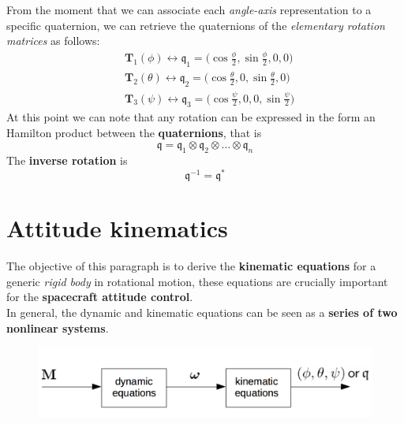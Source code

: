 \noindent
From the moment that we can associate each \textit{angle-axis} representation to a specific quaternion, we can retrieve the quaternions of the \textit{elementary rotation matrices} as follows:
{\Large{
    \begin{align*}
        &\mathbf{T}_1(\phi) \longleftrightarrow
        \mathfrak{q}_1 = \bigg(\cos \frac{\phi}{2}, \sin \frac{\phi}{2}, 0, 0 \bigg)\\
        &\mathbf{T}_2(\theta) \longleftrightarrow 
        \mathfrak{q}_2=\bigg(\cos \frac{\theta}{2}, 0, \sin \frac{\theta}{2}, 0 \bigg)\\
        &\mathbf{T}_3(\psi) \longleftrightarrow 
        \mathfrak{q}_3=\bigg(\cos \frac{\psi}{2}, 0, 0, \sin\frac{\psi}{2} \bigg)
    \end{align*}
}}
At this point we can note that any rotation can be expressed in the form an Hamilton product between the \textbf{quaternions}, that is 
{\Large{
    \begin{equation*}
        \mathfrak{q} = 
        \mathfrak{q}_1 \otimes
        \mathfrak{q}_2 \otimes
        \dots \otimes
        \mathfrak{q}_n
    \end{equation*}
}}
The \textbf{inverse rotation} is
{\Large{
    \begin{equation*}
        \mathfrak{q}^{-1} = \mathfrak{q}^*
    \end{equation*}
}}

\section{Attitude kinematics}
The objective of this paragraph is to derive the \textbf{kinematic equations} for a generic \textit{rigid body} in rotational motion, these equations are crucially important for the \textbf{spacecraft attitude control}.\\
In general, the dynamic and kinematic equations can be seen as a \textbf{series of two nonlinear systems}.

\begin{figure}[h]
    \centering 
    \includegraphics[scale=0.7]{AerospaceApplications/images/kin_dyn_series.png}
\end{figure}

